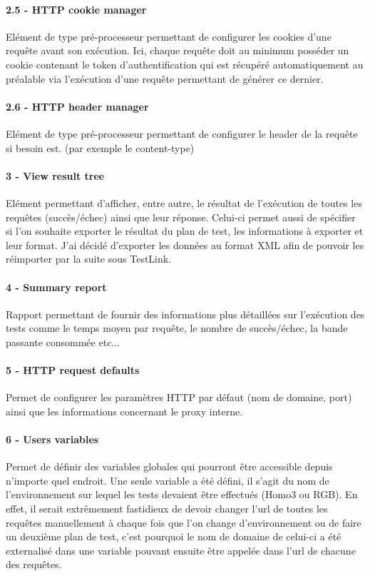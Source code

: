 	\paragraph{2.5 - HTTP cookie manager}
	Elément de type pré-processeur permettant de configurer les cookies d'une requête avant son exécution. Ici, chaque requête doit au minimum posséder un cookie contenant le token d'authentification qui est récupéré automatiquement au préalable via l'exécution d'une requête permettant de générer ce dernier.
	
	\paragraph{2.6 - HTTP header manager}
	Elément de type pré-processeur permettant de configurer le header de la requête si besoin est. (par exemple le content-type)
	
	\paragraph{3 - View result tree}
	Elément permettant d'afficher, entre autre, le résultat de l'exécution de toutes les requêtes (succès/échec) ainsi que leur réponse. Celui-ci permet aussi de spécifier si l'on souhaite exporter le résultat du plan de test, les informations à exporter et leur format. J'ai décidé d'exporter les données au format XML afin de pouvoir les réimporter par la suite sous TestLink.
	
	\paragraph{4 - Summary report}
	Rapport permettant de fournir des informations plus détaillées sur l'exécution des tests comme le temps moyen par requête, le nombre de succès/échec, la bande passante consommée etc...
	
	\paragraph{5 - HTTP request defaults}
	Permet de configurer les paramètres HTTP par défaut (nom de domaine, port) ainsi que les informations concernant le proxy interne.
	
	\paragraph{6 - Users variables}
	Permet de définir des variables globales qui pourront être accessible depuis n'importe quel endroit. Une seule variable a été défini, il s'agit du nom de l'environnement sur lequel les tests devaient être effectués (Homo3 ou RGB). En effet, il serait extrêmement fastidieux de devoir changer l'url de toutes les requêtes manuellement à chaque fois que l'on change d'environnement ou de faire un deuxième plan de test, c'est pourquoi le nom de domaine de celui-ci a été externalisé dans une variable pouvant ensuite être appelée dans l'url de chacune des requêtes.
	
